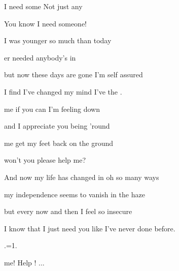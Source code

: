 

 I need some  Not just any

 You know I need someone! 

\zs
{} I was younger so much  than today

er needed anybody's  in  

but now these days are gone I'm  self assured

 I find I've changed my mind I've   the .
\ks

\zr
{} me if you can I'm feeling down 

and I  appreciate you being 'round 

 me get my feet back on the ground

won't you  please help me?
\kr

\zs
And now my life has changed in oh so many ways

my independence seems to vanish in the haze

but every now and then I feel so insecure

I know that I just need you like I've never done before.
\ks

\zr  \kr

.=1.
\ks

\zr
{} me! Help ! ...
\kr

\kp





